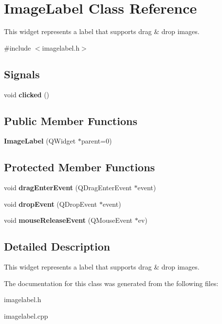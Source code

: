 \hypertarget{class_image_label}{
\section{ImageLabel Class Reference}
\label{class_image_label}
}


This widget represents a label that supports drag \& drop images.  




{\ttfamily \#include $<$imagelabel.h$>$}

\subsection*{Signals}
\begin{DoxyCompactItemize}
\item 
\hypertarget{class_image_label_ae9dbf16288bba1ecd91f5f394947bdce}{
void {\bfseries clicked} ()}
\label{class_image_label_ae9dbf16288bba1ecd91f5f394947bdce}

\end{DoxyCompactItemize}
\subsection*{Public Member Functions}
\begin{DoxyCompactItemize}
\item 
\hypertarget{class_image_label_a01bf7ab77bbe3d5d3f58b1cdcccc8667}{
{\bfseries ImageLabel} (QWidget $\ast$parent=0)}
\label{class_image_label_a01bf7ab77bbe3d5d3f58b1cdcccc8667}

\end{DoxyCompactItemize}
\subsection*{Protected Member Functions}
\begin{DoxyCompactItemize}
\item 
\hypertarget{class_image_label_a4e0ef86dd464eeaa43bb68dbe6829744}{
void {\bfseries dragEnterEvent} (QDragEnterEvent $\ast$event)}
\label{class_image_label_a4e0ef86dd464eeaa43bb68dbe6829744}

\item 
\hypertarget{class_image_label_ad3cbe573cd334f62996fd7ce3936d80b}{
void {\bfseries dropEvent} (QDropEvent $\ast$event)}
\label{class_image_label_ad3cbe573cd334f62996fd7ce3936d80b}

\item 
\hypertarget{class_image_label_a3948bad98d80ea79fbf2971e26d45110}{
void {\bfseries mouseReleaseEvent} (QMouseEvent $\ast$ev)}
\label{class_image_label_a3948bad98d80ea79fbf2971e26d45110}

\end{DoxyCompactItemize}


\subsection{Detailed Description}
This widget represents a label that supports drag \& drop images. 

The documentation for this class was generated from the following files:\begin{DoxyCompactItemize}
\item 
imagelabel.h\item 
imagelabel.cpp\end{DoxyCompactItemize}
